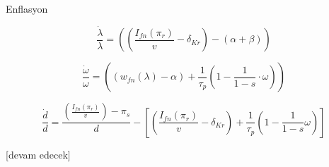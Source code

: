 \documentclass[12pt,fleqn]{article}\usepackage{../../common}
\begin{document}
Enflasyon

$$ 
\frac{\dot{\lambda}}{\lambda} =
\left( \left( \frac{I_{fn}(\pi_r)}{v} - \delta_{Kr} \right) - (\alpha + \beta) \right)
$$

$$ 
\frac{\dot{\omega}}{\omega} = 
\left( 
(w_{fn}(\lambda) - \alpha) + \frac{1}{\tau_p} \left( 1-\frac{1}{1-s} \cdot \omega\right)
\right)
$$


$$ 
\frac{\dot{d}}{d} = 
\frac{\left( \frac{I_{fn}(\pi_r)}{v} \right) - \pi_s }{d} - 
\left[ 
\left( \frac{I_{fn}(\pi_r)}{v} -\delta_{Kr} \right) + 
\frac{1}{\tau_p} \left(1 - \frac{1}{1-s} \omega\right)
\right]
$$












[devam edecek]
\end{document}
